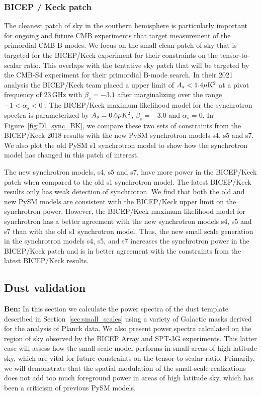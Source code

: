 \documentclass[twocolumn]{aastex631}
\begin{document}
\subsubsection{BICEP / Keck patch}
The cleanest patch of sky in the southern hemisphere is particularly important for ongoing and future CMB experiments that target measurement of the primordial CMB B-modes. We focus on the small clean patch of sky that is targeted for the BICEP/Keck experiment for their constraints on the tensor-to-scalar ratio. This overlaps with the tentative sky patch that will be targeted by the CMB-S4 experiment for their primordial B-mode search. In their 2021 analysis the BICEP/Keck team placed a upper limit of $A_s<1.4 \mu{\rm K}^2$ at a pivot frequency of 23\,GHz with $\beta_s=-3.1$ after marginalizing over the range $-1<\alpha_s<0$ \citep{Ade:2021}. The BICEP/Keck maximum likelihood model for the synchrotron spectra is parameterized by $A_s=0.6 \mu{\rm K}^2$, $\beta_s=-3.0$ and $\alpha_s=0$. In Figure~\ref{fig:Dl_sync_BK}, we compare these two sets of constraints from the BICEP/Keck 2018 results with the new PySM synchrotron models s4, s5 and s7. We also plot the old PySM s1 synchrotron model to show how the synchrotron model has changed in this patch of interest.

The new synchrotron models, s4, s5 and s7, have more power in the BICEP/Keck patch when compared to the old s1 synchrotron model. The latest BICEP/Keck results only has weak detection of synchrotron. We find that both the old and new PySM models are consistent with the BICEP/Keck upper limit on the synchrotron power. However, the BICEP/Keck maximum likelihood model for synchrotron has a better agreement with the new synchrotron models s4, s5 and s7 than with the old s1 synchrotron model. Thus, the new small scale generation in the synchrotron models s4, s5, and s7 increases the synchrotron power in the BICEP/Keck patch and is in better agreement with the constraints from the latest BICEP/Keck results.

\subsection{Dust validation} \label{sec:dust_validation}

\textbf{Ben:} In this section we calculate the power spectra of the dust template described in Section~\ref{sec:small_scales} using a variety of Galactic masks derived for the analysis of Planck data. We also present power spectra calculated on the region of sky observed by the BICEP Array and SPT-3G experiments. This latter case will assess how the small scale model performs in small areas of high latitude sky, which are vital for future constraints on the tensor-to-scalar ratio. Primarily, we will demonstrate that the spatial modulation of the small-scale realizations does not add too much foreground power in areas of high latitude sky, which has been a criticism of previous PySM models. 
\end{document}
